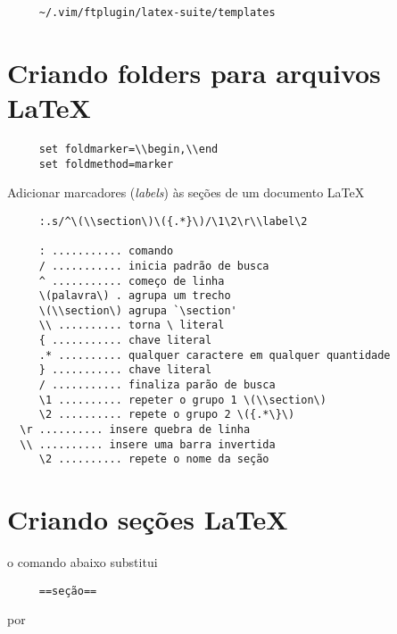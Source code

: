 \begin{verbatim}
     ~/.vim/ftplugin/latex-suite/templates
\end{verbatim}


\section{Criando folders para arquivos \LaTeX}
\label{Criando folders para arquivos LaTeX}

\begin{verbatim}
     set foldmarker=\\begin,\\end
     set foldmethod=marker
\end{verbatim}

Adicionar marcadores ({\em labels}) às seções de um documento \LaTeX
\begin{verbatim}
     :.s/^\(\\section\)\({.*}\)/\1\2\r\\label\2
     
     : ........... comando
     / ........... inicia padrão de busca
     ^ ........... começo de linha
     \(palavra\) . agrupa um trecho
     \(\\section\) agrupa `\section'
     \\ .......... torna \ literal
     { ........... chave literal
     .* .......... qualquer caractere em qualquer quantidade
     } ........... chave literal
     / ........... finaliza parão de busca
     \1 .......... repeter o grupo 1 \(\\section\) 
     \2 .......... repete o grupo 2 \({.*\}\)
  \r .......... insere quebra de linha
  \\ .......... insere uma barra invertida
     \2 .......... repete o nome da seção
\end{verbatim}

\section{Criando seções \LaTeX}\label{Criando seções latex}
o comando abaixo substitui

\begin{verbatim}
     ==seção==
\end{verbatim}

   por

